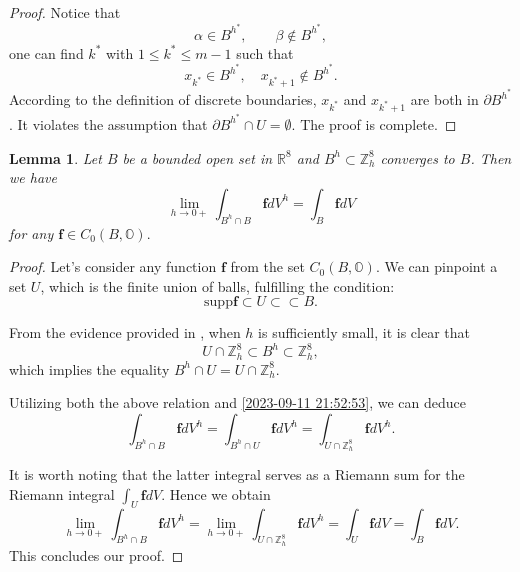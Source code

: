 \documentclass{amsart}
\newtheorem{lemma}[theorem]{Lemma}
\theoremstyle{definition}
\theoremstyle{remark}
\numberwithin{equation}{section}
\newcommand{\R}{\mathbb{R}}
\newcommand{\p}{\partial}
\newcommand{\OO}{\mathbb O}
\newcommand{\Z}{\mathbb Z}
\newcommand{\f}{\bm{f}}
\begin{document}
\begin{proof}
     Notice that \[
\alpha \in B^{h^*}, \qquad \beta\notin B^{h^*},
\] one can find $k^*$ with $1 \leqslant k^* \leqslant m - 1$ such that \begin{equation*}
        x_{k^*}\in B^{h^*},\quad  x_{k^*+1}\notin B^{h^*}.
    \end{equation*}
    According to the definition of discrete boundaries, $x_{k^*}$ and $x_{k^*+1}$ are both in $\p B^{h^*}$ . It violates the assumption that $\p B^{h^*}\cap U=\emptyset$. The proof is complete.
\end{proof}


\begin{lemma}\label{2023-09-11 22:31:45}
    Let $B$ be a bounded open set in $\R^8$ and $B^h \subset \Z^8_h$ converges to $B$. Then we have \[
\lim_{h\to 0+} \int_{B^h\cap B}\f dV^h=\int_B\f dV
\]
    for any $\f\in C_0(B,\OO).$
\end{lemma}
\begin{proof}
	Let's consider any function
	$\f$
  from the set
	 $C_0(B,\OO)$.
	 We can pinpoint a set
	$U$,  which is the finite union of balls, fulfilling the condition:
   \begin{equation}
        \label{2023-09-11 21:52:53}\mbox{supp} \f\subset U\subset\subset B.
    \end{equation}

From the evidence provided in , when
$h$ is sufficiently small, it is  clear that  \[
U\cap  \Z^8_h \subset B^h\subset \Z_h^8,
\]
   which implies the equality  $B^h\cap U=U\cap \Z^8_h.$

  Utilizing both the above relation and \eqref{2023-09-11 21:52:53}, we can deduce
  \begin{equation*}
        \int_{B^h\cap B}\f dV^h=\int_{B^h\cap U}\f dV^h=\int_{U\cap \Z^8_h}\f dV^h.
    \end{equation*}






It is worth noting that the latter integral serves as a Riemann sum for the Riemann integral
  $\int_U \f dV$. Hence we obtain  \begin{equation*}
        \lim_{h\to 0+}\int_{B^h\cap B}\f dV^h=\lim_{h\to 0+}\int_{U\cap \Z^8_h} \f dV^h=\int_{U}\f dV=\int_B \f dV.
    \end{equation*}
   This concludes our proof.
\end{proof}
\end{document}
